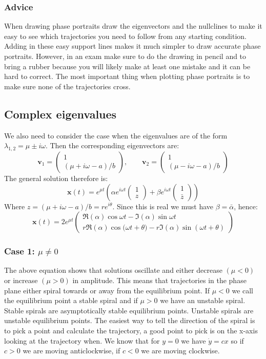 \documentclass[12pt]{article}
\begin{document}
\subsubsection*{Advice}
When drawing phase portraits draw the eigenvectors and the nullclines to make it easy to see which trajectories you need to follow from any starting condition. Adding in these easy support lines makes it much simpler to draw accurate phase portraits. However, in an exam make sure to do the drawing in pencil and to bring a rubber because you will likely make at least one mistake and it can be hard to correct. The most important thing when plotting phase portraits is to make sure none of the trajectories cross.
\subsection*{Complex eigenvalues}
We also need to consider the case when the eigenvalues are of the form \(\lambda_{1,2}=\mu\pm i\omega\). Then the corresponding eigenvectors are:
\[\textbf{v}_1=\begin{pmatrix}
    1 \\
    (\mu+i\omega-a)/b
\end{pmatrix},\qquad\textbf{v}_2=\begin{pmatrix}
    1 \\
    (\mu-i\omega -a)/b
\end{pmatrix}\]
The general solution therefore is:
\[\textbf{x}(t)=e^{\mu t}\left(\alpha e^{i\omega t}\begin{pmatrix}
    1 \\
    z
\end{pmatrix}+\beta e^{i\omega t}\begin{pmatrix}
    1 \\
    \bar{z}
\end{pmatrix}\right)\]
Where \(z=(\mu+i\omega-a)/b=re^{i\theta}\). Since this is real we must have \(\beta=\bar{\alpha}\), hence:
\[\textbf{x}(t)=2e^{\mu t}\begin{pmatrix}
    \Re(\alpha)\cos{\omega t - \Im(\alpha)\sin{\omega t}} \\
    r\Re(\alpha)\cos({\omega t+\theta)-r\Im(\alpha)\sin({\omega t+\theta})}
\end{pmatrix}\]
\subsubsection*{Case 1: \(\mu\ne0\)}
The above equation shows that solutions oscillate and either decrease \((\mu<0)\) or increase \((\mu>0)\) in amplitude. This means that trajectories in the phase plane either spiral towards or away from the equilibrium point. If \(\mu<0\) we call the equilibrium point a stable spiral and if \(\mu>0\) we have an unstable spiral. Stable spirals are asymptotically stable equilibrium points. Unstable spirals are unstable equilibrium points. The easiest way to tell the direction of the spiral is to pick a point and calculate the trajectory, a good point to pick is on the x-axis looking at the trajectory when. We know that for \(y=0\) we have \(\dot{y}=cx\) so if \(c>0\) we are moving anticlockwise, if \(c<0\) we are moving clockwise.
\end{document}
